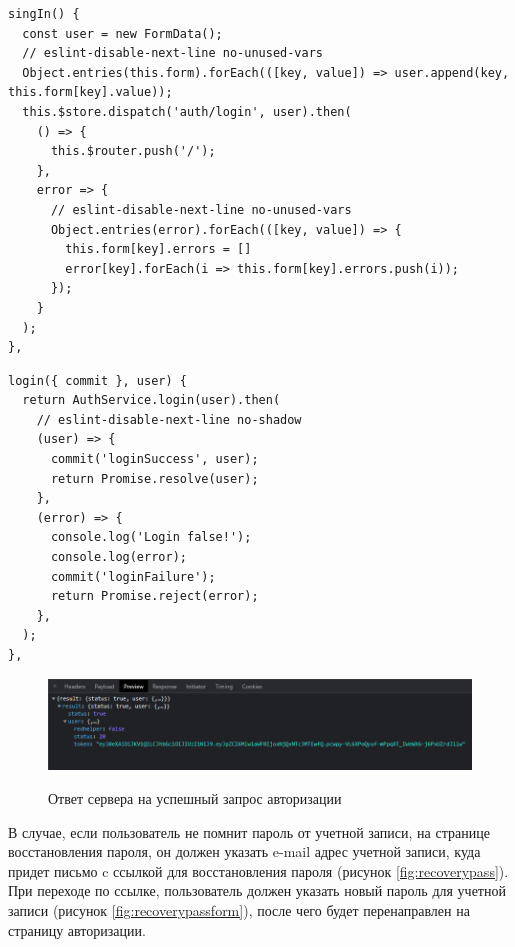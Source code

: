 \begin{lstlisting}[caption={Метод передающий форму в действие глобального хранилища}, label={ls:singinmethod}]
singIn() {
  const user = new FormData();
  // eslint-disable-next-line no-unused-vars
  Object.entries(this.form).forEach(([key, value]) => user.append(key, this.form[key].value));
  this.$store.dispatch('auth/login', user).then(
    () => {
      this.$router.push('/');
    },
    error => {
      // eslint-disable-next-line no-unused-vars
      Object.entries(error).forEach(([key, value]) => {
        this.form[key].errors = []
        error[key].forEach(i => this.form[key].errors.push(i));
      });
    }
  );
},
\end{lstlisting}

\begin{lstlisting}[caption={Реализация действия в глобальном хранилище, активирующее авторизацию}, label={ls:vuexlogin}]
login({ commit }, user) {
  return AuthService.login(user).then(
    // eslint-disable-next-line no-shadow
    (user) => {
      commit('loginSuccess', user);
      return Promise.resolve(user);
    },
    (error) => {
      console.log('Login false!');
      console.log(error);
      commit('loginFailure');
      return Promise.reject(error);
    },
  );
},
\end{lstlisting}

\begin{figure}[H]
\begin{center}
\includegraphics[width=0.9\hsize]{fig/login-server-response.png}\\[2mm]
\caption{Ответ сервера на успешный запрос авторизации}\label{fig:singinserverresponse}
\end{center}
\end{figure}

В случае, если пользователь не помнит пароль от учетной записи, на странице восстановления пароля, он должен указать e-mail адрес учетной записи, куда придет письмо c ссылкой для восстановления пароля (рисунок \ref{fig:recoverypass}). При переходе по ссылке, пользователь должен указать новый пароль для учетной записи (рисунок \ref{fig:recoverypassform}), после чего будет перенаправлен на страницу авторизации.

